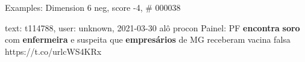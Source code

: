 \begin{frame}{Examples: Dimension 6 neg, score -4, \# 000038}
\footnotesize
\begin{alertblock}{text: t114788, user: unknown, 2021-03-30}
alô procon Painel: PF \textbf{encontra} \textbf{soro} com \textbf{enfermeira} e 
suspeita que \textbf{empresários} de MG receberam vacina falsa 
https://t.co/urlcWS4KRx 
\end{alertblock}
\end{frame}
